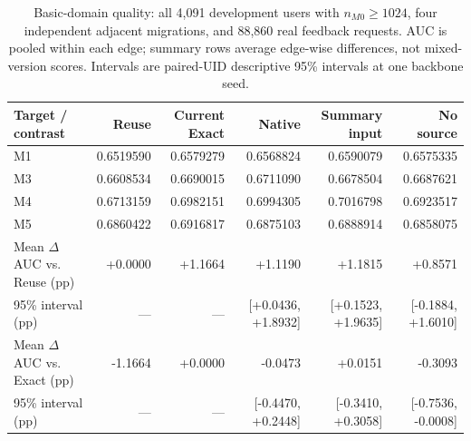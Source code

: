 \begin{table}[t]
\centering\small
\caption{Basic-domain quality: all 4,091 development users with $n_{M0}\ge1024$, four independent adjacent migrations, and 88,860 real feedback requests. AUC is pooled within each edge; summary rows average edge-wise differences, not mixed-version scores. Intervals are paired-UID descriptive 95\% intervals at one backbone seed.}
\label{tab:design1-quality}
\begin{tabular}{lrrrrr}
\toprule
Target / contrast & Reuse & Current Exact & Native & Summary input & No source \\
\midrule
M1 & 0.6519590 & 0.6579279 & 0.6568824 & 0.6590079 & 0.6575335 \\
M3 & 0.6608534 & 0.6690015 & 0.6711090 & 0.6678504 & 0.6687621 \\
M4 & 0.6713159 & 0.6982151 & 0.6994305 & 0.7016798 & 0.6923517 \\
M5 & 0.6860422 & 0.6916817 & 0.6875103 & 0.6888914 & 0.6858075 \\
\midrule
Mean $\Delta$AUC vs. Reuse (pp) & +0.0000 & +1.1664 & +1.1190 & +1.1815 & +0.8571 \\
95\% interval (pp) & --- & --- & [+0.0436, +1.8932] & [+0.1523, +1.9635] & [-0.1884, +1.6010] \\
Mean $\Delta$AUC vs. Exact (pp) & -1.1664 & +0.0000 & -0.0473 & +0.0151 & -0.3093 \\
95\% interval (pp) & --- & --- & [-0.4470, +0.2448] & [-0.3410, +0.3058] & [-0.7536, -0.0008] \\
\bottomrule
\end{tabular}
\end{table}
